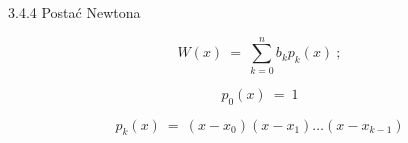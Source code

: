     \begin{frame}{3.4.4 Postać Newtona}
    \begin{block}{}
	$$W(x)\ =\ \sum_{k=0}^{n}b_{k}p_{k}(x)\ ;$$
	\end{block}
	$$p_{0}(x)\ =\ 1$$

	$$p_{k}(x)\ =\ (x-x_{0})(x-x_{1})\ldots(x-x_{k-1})$$

    \end{frame}
